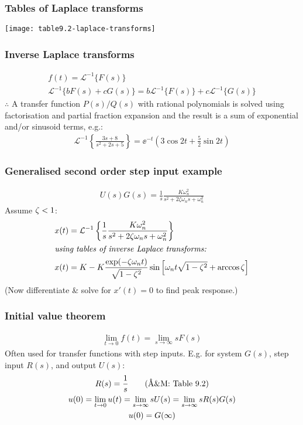 \documentclass{beamer-control}
\begin{document}
\begin{frame}
\frametitle{Tables of Laplace transforms}
  \centering
  \texttt{[image: table9.2-laplace-transforms]}
\end{frame}

\begin{frame}
\frametitle{Inverse Laplace transforms}
  \begin{gather}
    f(t) = \mathcal{L}^{-1}\bigl\{F(s)\bigr\} \\
    \mathcal{L}^{-1}\bigl\{b F(s) + c G(s)\bigr\} = b\mathcal{L}^{-1}\bigl\{F(s)\bigr\} + c\mathcal{L}^{-1}\bigl\{G(s)\bigr\}
  \end{gather}
  $\therefore$ A transfer function $P(s)/Q(s)$ with rational polynomials is solved using factorisation and partial fraction expansion and the result is a sum of exponential and/or sinusoid terms, e.g.:
  \begin{gather}
    \mathcal{L}^{-1}\left\{ \frac{3s+8}{s^2+2s+5} \right\} = \ee^{-t} \left( 3\cos 2t + \tfrac{5}{2}\sin 2t \right)
  \end{gather}
\end{frame}

\begin{frame}
\frametitle{Generalised second order step input example}

\begin{gather}
U(s) G(s) = \frac{1}{s}\frac{K\omega_n^2}{s^2+2\zeta\omega_ns+\omega_n^2}
\end{gather}
Assume $\zeta<1$:
\begin{align}
x(t) &= \mathcal{L}^{-1}\left\{ \frac{1}{s}\frac{K\omega_n^2}{s^2+2\zeta\omega_n s+\omega_n^2} \right\} \\
\intertext{\em using tables of inverse Laplace transforms:}
x(t) &= K - K\frac{\exp(-\zeta\omega_n t)}{\sqrt{1-\zeta^2}}\sin\left[\omega_n t\sqrt{1-\zeta^2}+\arccos\zeta\right] \label{eq:xt2o}
\end{align}
(Now differentiate \& solve for $x'(t)=0$ to find peak response.)

\end{frame}


\begin{frame}
\frametitle{Initial value theorem}

\begin{gather}
\lim_{t\to0} f(t) = \lim_{s\to\infty} s F(s)
\end{gather}
Often used for transfer functions with step inputs. E.g. for system $G(s)$, step input $R(s)$, and output $U(s)$:
\begin{gather}
R(s) = \frac{1}{s} \qquad\text{(\AA\&M: Table 9.2)}\\
u(0) = \lim_{t\to0} u(t) = \lim_{s\to\infty} s U(s) = \lim_{s\to\infty} s R(s)G(s) \\
u(0) = G(\infty)
\end{gather}
\end{frame}
\end{document}
